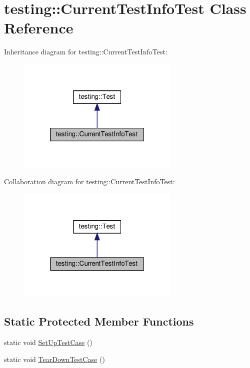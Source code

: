 \hypertarget{classtesting_1_1_current_test_info_test}{}\section{testing\+:\+:Current\+Test\+Info\+Test Class Reference}
\label{classtesting_1_1_current_test_info_test}


Inheritance diagram for testing\+:\+:Current\+Test\+Info\+Test\+:
\nopagebreak
\begin{figure}[H]
\begin{center}
\leavevmode
\includegraphics[width=220pt]{classtesting_1_1_current_test_info_test__inherit__graph}
\end{center}
\end{figure}


Collaboration diagram for testing\+:\+:Current\+Test\+Info\+Test\+:
\nopagebreak
\begin{figure}[H]
\begin{center}
\leavevmode
\includegraphics[width=220pt]{classtesting_1_1_current_test_info_test__coll__graph}
\end{center}
\end{figure}
\subsection*{Static Protected Member Functions}
\begin{DoxyCompactItemize}
\item 
static void \hyperlink{classtesting_1_1_current_test_info_test_a61bad7ce29923afd464daf9684b6269e}{Set\+Up\+Test\+Case} ()
\item 
static void \hyperlink{classtesting_1_1_current_test_info_test_a9a80a5a3e6e70c619870c2ae9df892a6}{Tear\+Down\+Test\+Case} ()
\end{DoxyCompactItemize}

